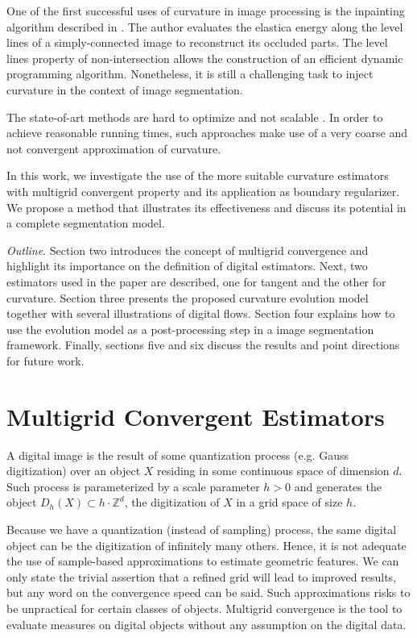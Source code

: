 \documentclass[runningheads]{llncs}
\begin{document}
One of the first successful uses of curvature in image processing is the inpainting algorithm described in \cite{masnou98}. The author evaluates the elastica energy along the level lines of a simply-connected image to reconstruct its occluded parts. The level lines property of non-intersection allows the construction of an efficient dynamic programming algorithm. Nonetheless, it is still a challenging task to inject curvature in the context of image segmentation. 

The state-of-art methods are hard to optimize and  not scalable \cite{schoenemann09,nieuwenhuis14}. In order to achieve reasonable running times, such approaches make use of a very coarse and not convergent approximation of curvature.

In this work, we investigate the use of the more suitable curvature estimators with multigrid convergent property and its application as boundary regularizer. We propose a method that illustrates its effectiveness and discuss its potential in a complete segmentation model. 

\textit{Outline}. Section two introduces the concept of multigrid convergence and highlight its importance on the definition of digital estimators. Next, two estimators used in the paper are described, one for tangent and the other for curvature. Section three presents the proposed curvature evolution model together with several illustrations of digital flows. Section four explains how to use the evolution model as a post-processing step in a image segmentation framework. Finally, sections five and six discuss the results and point directions for future work.




\section{Multigrid Convergent Estimators}



A digital image is the result of some quantization process (e.g. Gauss digitization) over an object $X$ residing in some continuous space of dimension $d$. Such process is parameterized by a scale parameter $h>0$ and generates the object $D_h(X) \subset h \cdot \mathbb{Z}^d$, the digitization of $X$ in a grid space of size $h$. 

Because we have a quantization (instead of sampling) process, the same digital object can be the digitization of infinitely many others. Hence, it is not adequate the use of sample-based approximations to estimate geometric features. We can only state the trivial assertion that a refined grid will lead to improved results, but any word on the convergence speed can be said. Such approximations risks to be unpractical for certain classes of objects. Multigrid convergence is the tool to evaluate measures on digital objects without any assumption on the digital data. 
\end{document}
